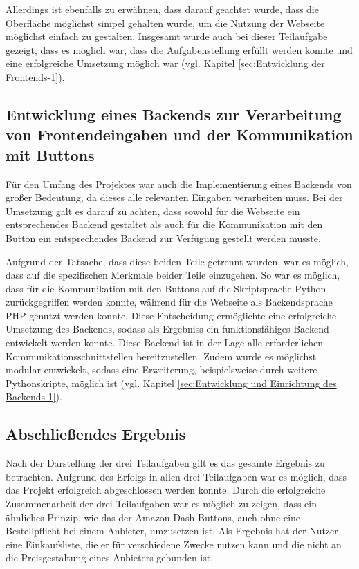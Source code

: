 Allerdings ist ebenfalls zu erwähnen, dass darauf geachtet wurde, dass die Oberfläche möglichst simpel gehalten wurde, um die Nutzung der Webseite möglichst einfach zu gestalten. 
Insgesamt wurde auch bei dieser Teilaufgabe gezeigt, dass es möglich war, dass die Aufgabenstellung erfüllt werden konnte und eine erfolgreiche Umsetzung möglich war (vgl. Kapitel \ref{sec:Entwicklung der Frontends-1}).

\newpage

\subsection{Entwicklung eines Backends zur Verarbeitung von Frontendeingaben und der Kommunikation mit Buttons}
\label{sec:ErgebnisBackend}
Für den Umfang des Projektes war auch die Implementierung eines Backends von großer Bedeutung, da dieses alle relevanten Eingaben verarbeiten muss. Bei der Umsetzung galt es darauf zu achten, dass sowohl für die Webseite ein entsprechendes Backend gestaltet als auch für die Kommunikation mit den Button ein entsprechendes Backend zur Verfügung gestellt werden musste. 

Aufgrund der Tatsache, dass diese beiden Teile getrennt wurden, war es möglich, dass auf die spezifischen Merkmale beider Teile einzugehen. So war es möglich, dass für die Kommunikation mit den Buttons auf die Skriptsprache Python zurückgegriffen werden konnte, während für die Webseite als Backendsprache \ac{PHP} genutzt werden konnte. Diese Entscheidung ermöglichte eine erfolgreiche Umsetzung des Backends, sodass als Ergebniss ein funktionsfähiges Backend entwickelt werden konnte. Diese Backend ist in der Lage alle erforderlichen Kommunikationsschnittstellen bereitzustellen. Zudem wurde es möglichst modular entwickelt, sodass eine Erweiterung, beispielsweise durch weitere Pythonskripte, möglich ist (vgl. Kapitel \ref{sec:Entwicklung und Einrichtung des Backends-1}). 

\subsection{Abschließendes Ergebnis}
\label{sec:ErgebnisAbschluss}
Nach der Darstellung der drei Teilaufgaben gilt es das gesamte Ergebnis zu betrachten. Aufgrund des Erfolgs in allen drei Teilaufgaben war es möglich, dass das Projekt erfolgreich abgeschlossen werden konnte. Durch die erfolgreiche Zusammenarbeit der drei Teilaufgaben war es möglich zu zeigen, dass ein ähnliches Prinzip, wie das der Amazon Dash Buttons, auch ohne eine Bestellpflicht bei einem Anbieter, umzusetzen ist. Als Ergebnis hat der Nutzer eine Einkaufsliste, die er für verschiedene Zwecke nutzen kann und die nicht an die Preisgestaltung eines Anbieters gebunden ist. 

